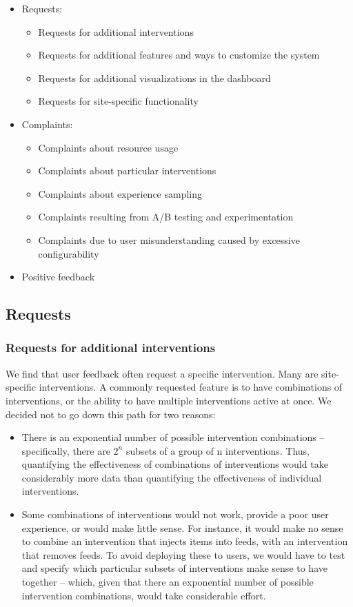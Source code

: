 \begin{itemize}
\item Requests:
\begin{itemize}
\item Requests for additional interventions
\item Requests for additional features and ways to customize the system
\item Requests for additional visualizations in the dashboard
\item Requests for site-specific functionality
\end{itemize}
\item Complaints:
\begin{itemize}
\item Complaints about resource usage
\item Complaints about particular interventions
\item Complaints about experience sampling
\item Complaints resulting from A/B testing and experimentation
\item Complaints due to user misunderstanding caused by excessive configurability
\end{itemize}
\item Positive feedback
\end{itemize}

\subsection{Requests}

\subsubsection{Requests for additional interventions}

We find that user feedback often request a specific intervention. Many are site-specific interventions. A commonly requested feature is to have combinations of interventions, or the ability to have multiple interventions active at once. We decided not to go down this path for two reasons:

\begin{itemize}
\item There is an exponential number of possible intervention combinations -- specifically, there are $2^n$ subsets of a group of n interventions. Thus, quantifying the effectiveness of combinations of interventions would take considerably more data than quantifying the effectiveness of individual interventions.
\item Some combinations of interventions would not work, provide a poor user experience, or would make little sense. For instance, it would make no sense to combine an intervention that injects items into feeds, with an intervention that removes feeds. To avoid deploying these to users, we would have to test and specify which particular subsets of interventions make sense to have together -- which, given that there an exponential number of possible intervention combinations, would take considerable effort.
\end{itemize}

